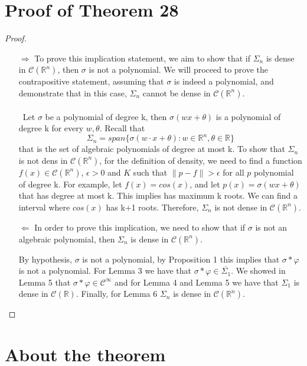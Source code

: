 \documentclass[../main.tex]{subfiles}
\begin{document}
\section{Proof of Theorem 28}
	\begin{proof}~ %

	\begin{enumerate}
		\item[$\Rightarrow$] 
		To prove this implication statement, we aim to show that if $\Sigma_n$ is dense in $\mathcal{C}(\mathbb{R}^n)$, then $\sigma$ is not a polynomial.
		 We will proceed to prove the contrapositive statement, assuming that $\sigma$ is indeed a polynomial, and demonstrate that in this case, $\Sigma_n$ cannot be dense in $\mathcal{C}(\mathbb{R}^n)$. \\ \\ Let $\sigma$ be a polynomial of degree k, then $\sigma(wx+\theta)$ is a polynomial  of degree k for every $w,\theta$. Recall that $$ \Sigma_n = span\{\sigma(w\cdot x + \theta) : w\in \mathbb{R}^n, \theta \in \mathbb{R} \}$$  that is the set of algebraic polynomials of degree at most k. To show that $\Sigma_n$ is not dens in $\mathcal{C}(\mathbb{R}^n)$, for the definition of density, we need to find a function $f(x)\in \mathcal{C}(\mathbb{R}^n)$, $\epsilon > 0$ and $K$ such that  $\| p-f \| > \epsilon$ for all $p$ polynomial of degree k. For example, let $f(x)=cos(x)$, and let $p(x)= \sigma(wx+\theta)$ that has degree at most k. This implies has maximum k roots. We can find a interval where $cos(x)$ has k+1 roots. Therefore, $\Sigma_n$ is not dense in $\mathcal{C}(\mathbb{R}^n)$. 

		\item[$\Leftarrow$]  In order to prove this implication, we need to show that if $\sigma$ is not an algebraic polynomial, then $\Sigma_n$ is dense in $\mathcal{C}(\mathbb{R}^n)$.
		
		
		 By hypothesis, $\sigma$ is not a polynomial, by Proposition 1 this implies that $\sigma \ast \varphi$ is not a polynomial. For Lemma 3 we have that $\sigma \ast \varphi \in \overline{\Sigma_1}$. We showed in Lemma 5 that $\sigma \ast \varphi \in \mathcal{C}^\infty$ and for Lemma 4 and  Lemma 5 we have that $\Sigma_1$ is dense in $\mathcal{C}(\mathbb{R})$. Finally, for Lemma 6 $\Sigma_n$ is dense in $\mathcal{C}(\mathbb{R}^n)$.
	\end{enumerate}
\end{proof}


\section{About the theorem}
\end{document}
